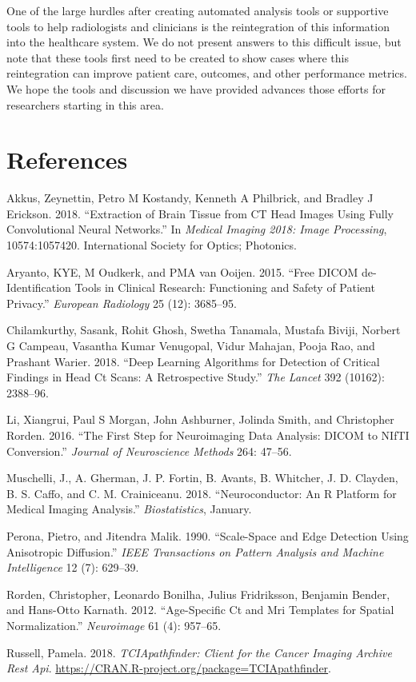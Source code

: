 \documentclass[]{elsarticle} %
\begin{document}
One of the large hurdles after creating automated analysis tools or
supportive tools to help radiologists and clinicians is the
reintegration of this information into the healthcare system. We do not
present answers to this difficult issue, but note that these tools first
need to be created to show cases where this reintegration can improve
patient care, outcomes, and other performance metrics. We hope the tools
and discussion we have provided advances those efforts for researchers
starting in this area.

\hypertarget{references}{%
\section*{References}\label{references}}

\hypertarget{refs}{}
\leavevmode\hypertarget{ref-ct_bet}{}%
Akkus, Zeynettin, Petro M Kostandy, Kenneth A Philbrick, and Bradley J
Erickson. 2018. ``Extraction of Brain Tissue from CT Head Images Using
Fully Convolutional Neural Networks.'' In \emph{Medical Imaging 2018:
Image Processing}, 10574:1057420. International Society for Optics;
Photonics.

\leavevmode\hypertarget{ref-aryanto2015free}{}%
Aryanto, KYE, M Oudkerk, and PMA van Ooijen. 2015. ``Free DICOM
de-Identification Tools in Clinical Research: Functioning and Safety of
Patient Privacy.'' \emph{European Radiology} 25 (12): 3685--95.

\leavevmode\hypertarget{ref-cq500}{}%
Chilamkurthy, Sasank, Rohit Ghosh, Swetha Tanamala, Mustafa Biviji,
Norbert G Campeau, Vasantha Kumar Venugopal, Vidur Mahajan, Pooja Rao,
and Prashant Warier. 2018. ``Deep Learning Algorithms for Detection of
Critical Findings in Head Ct Scans: A Retrospective Study.'' \emph{The
Lancet} 392 (10162): 2388--96.

\leavevmode\hypertarget{ref-dcm2niix}{}%
Li, Xiangrui, Paul S Morgan, John Ashburner, Jolinda Smith, and
Christopher Rorden. 2016. ``The First Step for Neuroimaging Data
Analysis: DICOM to NIfTI Conversion.'' \emph{Journal of Neuroscience
Methods} 264: 47--56.

\leavevmode\hypertarget{ref-neuroconductor}{}%
Muschelli, J., A. Gherman, J. P. Fortin, B. Avants, B. Whitcher, J. D.
Clayden, B. S. Caffo, and C. M. Crainiceanu. 2018. ``Neuroconductor: An
R Platform for Medical Imaging Analysis.'' \emph{Biostatistics},
January.

\leavevmode\hypertarget{ref-peronamalik}{}%
Perona, Pietro, and Jitendra Malik. 1990. ``Scale-Space and Edge
Detection Using Anisotropic Diffusion.'' \emph{IEEE Transactions on
Pattern Analysis and Machine Intelligence} 12 (7): 629--39.

\leavevmode\hypertarget{ref-rorden2012age}{}%
Rorden, Christopher, Leonardo Bonilha, Julius Fridriksson, Benjamin
Bender, and Hans-Otto Karnath. 2012. ``Age-Specific Ct and Mri Templates
for Spatial Normalization.'' \emph{Neuroimage} 61 (4): 957--65.

\leavevmode\hypertarget{ref-TCIApathfinder}{}%
Russell, Pamela. 2018. \emph{TCIApathfinder: Client for the Cancer
Imaging Archive Rest Api}.
\url{https://CRAN.R-project.org/package=TCIApathfinder}.
\end{document}
